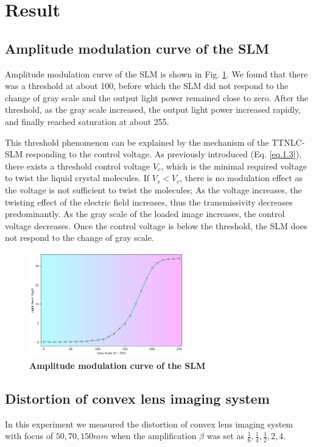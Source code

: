 \documentclass[10pt,a4paper,twocolumn,twoside,UTF8]{article}
\begin{document}

\section{Result}
	\subsection{Amplitude modulation curve of the SLM}
	Amplitude modulation curve of the SLM is shown in Fig. \ref{fig.1.1}. We found that there was a threshold at about 100, 
	before which the SLM did not respond to the change of gray scale and the output light power remained close to zero. 
	After the threshold, as the gray scale increased, the output light power increased rapidly, and finally reached saturation at about 255.
	
	This threshold phenomenon can be explained by the mechanism of the TTNLC-SLM responding to the control voltage. 
	As previously introduced (Eq. \ref{eq.1.3}), there exists a threshold control voltage $V_c$, which is the minimal required voltage to twist the liquid crystal molecules.
	If $V_s < V_c$, there is no modulation effect as the voltage is not sufficient to twist the molecules; As the voltage increases, the twisting effect of the electric field increases, thus the transmissivity decreases predominantly.
	As the gray scale of the loaded image increases, the control voltage decreases. Once the control voltage is below the threshold, the SLM does not respond to the change of gray scale.

	\begin{figure}[htbp]
		\centering
		\includegraphics[width=0.6\textwidth]{attachments/fig.1.1.png}
		\caption{\textbf{Amplitude modulation curve of the SLM}}
		\label{fig.1.1}
	\end{figure}

	\subsection{Distortion of convex lens imaging system}
	In this experiment we measured the distortion of convex lens imaging system with focus of $50, 70, 150 mm$ when the amplification $\beta$ was set as $\frac{1}{6}, \frac{1}{4}, \frac{1}{2}, 2, 4$.
	
\end{document}
